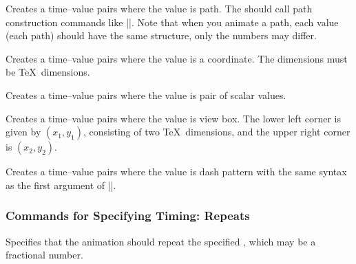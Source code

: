 \begin{command}{\pgfsys@animation@val@path{}}
  Creates a time--value pairs where the value is path. The 
  should call path construction commands like |\pgfsys@lineto|. Note
  that when you animate a path, each value (each path) should have the
  same structure, only the numbers may differ.  
\end{command}

\begin{command}{\pgfsys@animation@val@translate{}}
  Creates a time--value pairs where the value is a coordinate. The
  dimensions must be \TeX\ dimensions.
\end{command}

\begin{command}{\pgfsys@animation@val@scale{}}
  Creates a time--value pairs where the value is pair of scalar values.
\end{command}

\begin{command}{\pgfsys@animation@val@viewbox{}}
  Creates a time--value pairs where the value is view box. The lower
  left corner is given by $(x_1,y_1)$, consisting of two \TeX\
  dimensions, and the upper right corner is $(x_2,y_2)$.
\end{command}


\begin{command}{\pgfsys@animation@val@dashpattern{}}
  Creates a time--value pairs where the value is dash pattern with the
  same syntax as the first argument of |\pgfsys@setdash|.
\end{command}


\subsubsection{Commands for Specifying Timing: Repeats}


\begin{command}{\pgfsys@animation@repeat{}}
  Specifies that the animation should repeat the specified
  , which may be a fractional number.
\begin{codeexample}[width=2cm]
\end{codeexample}
\end{command}

